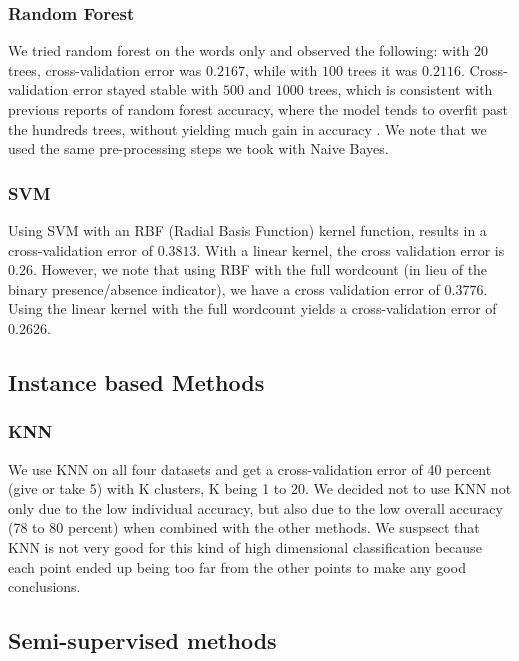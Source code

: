 \documentclass[11pt,twocolumn]{report}
\begin{document}
     \subsubsection{Random Forest}
     We tried random forest on the words only and observed the following: with $20$ trees, cross-validation error was $0.2167$, while with $100$ trees it was $0.2116$. Cross-validation error stayed stable with $500$ and $1000$ trees, which is consistent with previous reports of random forest accuracy, where the model tends to overfit past the hundreds trees, without yielding much gain in accuracy \cite{latinne2001limiting,oshiro2012many}. We note that we used the same pre-processing steps we took with Naive Bayes.

    \subsubsection{SVM}
    Using SVM with an RBF (Radial Basis Function) kernel function, results in a cross-validation error of $0.3813$. With a linear kernel, the cross validation error is $0.26$. However, we note that using RBF with the full wordcount (in lieu of the binary presence/absence indicator), we have a cross validation error of $0.3776$. Using the linear kernel with the full wordcount yields a cross-validation error of $0.2626$.
    
    \subsection*{Instance based Methods}
    \subsubsection{KNN}
    
    We use KNN on all four datasets and get a cross-validation error of 40 percent (give or take 5) with K clusters, K being 1 to 20. We decided not to use KNN not only due to the low individual accuracy, but also due to the low overall accuracy (78 to 80 percent) when combined with the other methods. We suspsect that KNN is not very good for this kind of high dimensional classification because each point ended up being too far from the other points to make any good conclusions. 
   
    \subsection*{Semi-supervised methods}
\end{document}
